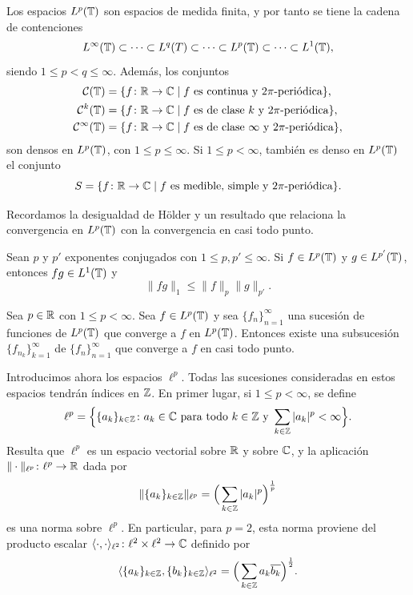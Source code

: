 \documentclass[a4paper, 12pt]{book}
\begin{document}
Los espacios $L^p(\mathbb T)$ son espacios de medida finita, y por tanto se tiene la cadena de contenciones
\[L^\infty(\mathbb T) \subset \cdots \subset L^q(T) \subset \cdots \subset L^p(\mathbb T) \subset \cdots \subset L^1(\mathbb T),\]
siendo $1 \leq p < q \leq \infty$.
Además, los conjuntos
\begin{align*}
    \mathcal{C}(\mathbb T) &= \{f \colon \mathbb R \to \mathbb C \mid f \textup{ es continua y } 2\pi \textup{-periódica}\}, \\
    \mathcal{C}^k(\mathbb T) &= \{f \colon \mathbb R \to \mathbb C \mid f \textup{ es de clase } k \textup{ y } 2\pi \textup{-periódica}\},
    \\
    \mathcal{C}^\infty(\mathbb T) &= \{f \colon \mathbb R \to \mathbb C \mid f \textup{ es de clase } \infty \textup{ y } 2\pi \textup{-periódica}\},
\end{align*}
son densos en $L^p(\mathbb T)$, con $1 \leq p \leq \infty$. Si $1 \leq p < \infty$, también es denso en $L^p(\mathbb T)$ el conjunto
\[S = \{f \colon \mathbb R \to \mathbb C \mid f \textup{ es medible, simple y } 2\pi \textup{-periódica}\}.\]

Recordamos la desigualdad de Hölder y un resultado que relaciona la convergencia en $L^p(\mathbb T)$ con la convergencia en casi todo punto.

\begin{theorem}\label{1.1.1}
    Sean $p$ y $p'$ exponentes conjugados con $1 \leq p,p' \leq \infty$. Si $f \in L^p(\mathbb T)$ y $g \in L^{p'}(\mathbb T)$, entonces $fg \in L^1(\mathbb T)$ y
    \[\|fg\|_1 \leq \|f\|_p\|g\|_{p'}.\]
\end{theorem}

\begin{theorem}\label{1.1.2}
    Sea $p\in\mathbb R$ con $1\leq p < \infty$. Sea $f\in L^p(\mathbb T)$ y sea $\{f_n\}_{n=1}^\infty$ una sucesión de funciones de $L^p(\mathbb T)$ que converge a $f$ en $L^p(\mathbb T)$. Entonces existe una subsucesión $\{f_{n_k}\}_{k=1}^\infty$ de $\{f_n\}_{n=1}^\infty$ que converge a $f$ en casi todo punto.
\end{theorem}

Introducimos ahora los espacios $\ell^p$. Todas las sucesiones consideradas en estos espacios tendrán índices en $\mathbb Z$. En primer lugar, si $1\leq p<\infty$, se define
\[\ell^p=\Bigl\{\{a_k\}_{k\in \mathbb Z} \colon a_k \in \mathbb C \textup{ para todo } k \in \mathbb Z \textup{ y } \sum_{k\in\mathbb Z}|a_k|^p < \infty\Bigr\}.\]
Resulta que $\ell^p$ es un espacio vectorial sobre $\mathbb R$ y sobre $\mathbb C$, y la aplicación $\|\cdot\|_{\ell^p} \colon \ell^p \to \mathbb R$ dada por
\[\|\{a_k\}_{k\in\mathbb Z}\|_{\ell^p} = \Bigl(\,\sum_{k\in\mathbb Z}|a_k|^p\Bigr)^{\frac{1}{p}}\]
es una norma sobre $\ell^p$. En particular, para $p = 2$, esta norma proviene del producto escalar $\langle \cdot, \cdot \rangle_{\ell^2} \colon \ell^2 \times \ell^2 \to \mathbb C$ definido por
\[\langle \{a_k\}_{k\in\mathbb Z}, \{b_k\}_{k\in\mathbb Z} \rangle_{\ell^2} = \Bigl(\,\sum_{k\in\mathbb Z}a_k\overline{b_k}\Bigr)^{\frac{1}{2}}.\] 
\end{document}
